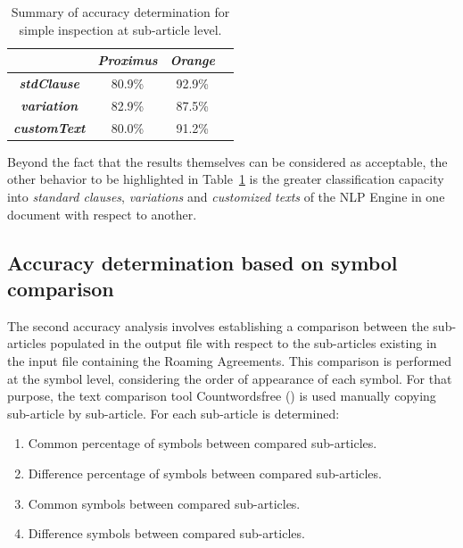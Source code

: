 \begin{table}[htbp]
\caption{Summary of accuracy determination for simple inspection at sub-article level.}
\begin{center}
\begin{tabular}{|c|c|c|c|}
\hline
\textbf{} & \textbf{\textit{Proximus}}& \textbf{\textit{Orange}} \\
\hline
\textbf{\textit{stdClause}}& 80.9\% & 92.9\% \\
\hline
\textbf{\textit{variation}}& 82.9\% & 87.5\% \\
\hline
\textbf{\textit{customText}}& 80.0\% & 91.2\% \\
\hline
\end{tabular}
\label{table3}
\end{center}
\end{table}

Beyond the fact that the results themselves can be considered as acceptable, the other behavior to be highlighted in Table~\ref{table3} is the greater classification capacity into \textit{standard clauses}, \textit{variations} and \textit{customized texts} of the NLP Engine in one document with respect to another.

\subsection{Accuracy determination based on symbol comparison}
The second accuracy analysis involves establishing a comparison between the sub-articles populated in the output file with respect to the sub-articles existing in the input file containing the Roaming Agreements. This comparison is performed at the symbol level, considering the order of appearance of each symbol. For that purpose, the text comparison tool Countwordsfree (\cite{countwordsfree}) is used manually copying sub-article by sub-article. For each sub-article is determined:

\begin{enumerate}
\item Common percentage of symbols between compared sub-articles.
\item Difference percentage of symbols between compared sub-articles.
\item Common symbols between compared sub-articles.
\item Difference symbols between compared sub-articles.
\end{enumerate}

